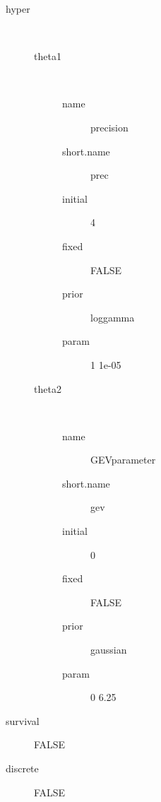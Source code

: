 \begin{description}
	\item[hyper]\ 
	 \begin{description}
	 	\item[theta1]\ 
	 	 \begin{description}
	 	 	 \item[ name ] precision 
	 	 	 \item[ short.name ] prec 
	 	 	 \item[ initial ] 4 
	 	 	 \item[ fixed ] FALSE 
	 	 	 \item[ prior ] loggamma 
	 	 	 \item[ param ] 1 1e-05 
	 	 \end{description}
	 	\item[theta2]\ 
	 	 \begin{description}
	 	 	 \item[ name ] GEVparameter 
	 	 	 \item[ short.name ] gev 
	 	 	 \item[ initial ] 0 
	 	 	 \item[ fixed ] FALSE 
	 	 	 \item[ prior ] gaussian 
	 	 	 \item[ param ] 0 6.25 
	 	 \end{description}
	 \end{description}
	 \item[ survival ] FALSE 
	 \item[ discrete ] FALSE 
\end{description}

